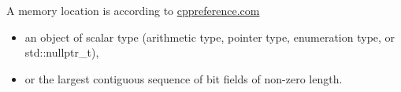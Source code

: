 A memory location is according to \href{http://en.cppreference.com/w/cpp/language/memory_model}{cppreference.com}

\begin{itemize}
\item 
an object of scalar type (arithmetic type, pointer type, enumeration type, or std::nullptr\_t),

\item 
or the largest contiguous sequence of bit fields of non-zero length.
\end{itemize}











